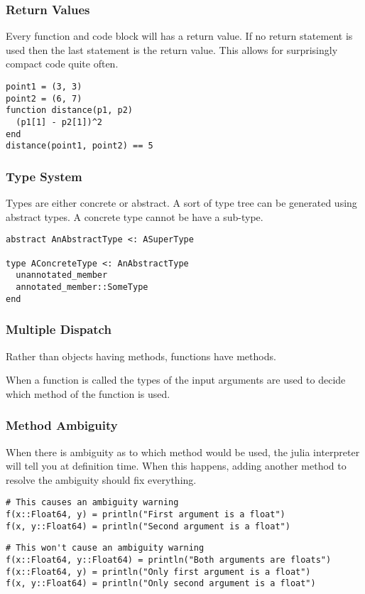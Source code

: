 \documentclass{beamer}
\begin{document}
\begin{frame}[fragile]
\frametitle{Return Values}
Every function and code block will has a return value. If no return statement
is used then the last statement is the return value. This allows for 
surprisingly compact code quite often.

\begin{verbatim}
point1 = (3, 3)
point2 = (6, 7)
function distance(p1, p2)
  (p1[1] - p2[1])^2
end
distance(point1, point2) == 5
\end{verbatim}

\end{frame}

\begin{frame}[fragile]
\frametitle{Type System}

Types are either concrete or abstract. A sort of type tree can be generated
using abstract types. A concrete type cannot be have a sub-type.

\begin{verbatim}
abstract AnAbstractType <: ASuperType

type AConcreteType <: AnAbstractType
  unannotated_member
  annotated_member::SomeType
end

\end{verbatim}

\end{frame}

\begin{frame}
\frametitle{Multiple Dispatch}

Rather than objects having methods, functions have methods.

When a function is called the types of the input arguments are used to decide 
which method of the function is used.

\end{frame}

\begin{frame}[fragile]
\frametitle{Method Ambiguity}

When there is ambiguity as to which method would be used, the julia interpreter
will tell you at definition time. When this happens, adding another method to 
resolve the ambiguity should fix everything.

\begin{verbatim}
# This causes an ambiguity warning
f(x::Float64, y) = println("First argument is a float")
f(x, y::Float64) = println("Second argument is a float")
\end{verbatim}

\begin{verbatim}
# This won't cause an ambiguity warning
f(x::Float64, y::Float64) = println("Both arguments are floats")
f(x::Float64, y) = println("Only first argument is a float")
f(x, y::Float64) = println("Only second argument is a float")
\end{verbatim}
\end{frame}
\end{document}
